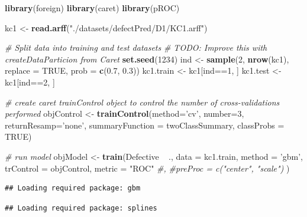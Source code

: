 \documentclass[]{book}
\newenvironment{Shaded}{\begin{snugshade}}{\end{snugshade}}
\newcommand{\KeywordTok}[1]{\textcolor[rgb]{0.13,0.29,0.53}{\textbf{{#1}}}}
\newcommand{\DataTypeTok}[1]{\textcolor[rgb]{0.13,0.29,0.53}{{#1}}}
\newcommand{\DecValTok}[1]{\textcolor[rgb]{0.00,0.00,0.81}{{#1}}}
\newcommand{\FloatTok}[1]{\textcolor[rgb]{0.00,0.00,0.81}{{#1}}}
\newcommand{\StringTok}[1]{\textcolor[rgb]{0.31,0.60,0.02}{{#1}}}
\newcommand{\CommentTok}[1]{\textcolor[rgb]{0.56,0.35,0.01}{\textit{{#1}}}}
\newcommand{\OtherTok}[1]{\textcolor[rgb]{0.56,0.35,0.01}{{#1}}}
\newcommand{\NormalTok}[1]{{#1}}
\begin{document}
\begin{Shaded}
\begin{Highlighting}[]
\KeywordTok{library}\NormalTok{(foreign)}
\KeywordTok{library}\NormalTok{(caret)}
\KeywordTok{library}\NormalTok{(pROC)}

\NormalTok{kc1 <-}\StringTok{ }\KeywordTok{read.arff}\NormalTok{(}\StringTok{"./datasets/defectPred/D1/KC1.arff"}\NormalTok{)}

\CommentTok{# Split data into training and test datasets}
\CommentTok{# TODO: Improve this with createDataParticion from Caret}
\KeywordTok{set.seed}\NormalTok{(}\DecValTok{1234}\NormalTok{)}
\NormalTok{ind <-}\StringTok{ }\KeywordTok{sample}\NormalTok{(}\DecValTok{2}\NormalTok{, }\KeywordTok{nrow}\NormalTok{(kc1), }\DataTypeTok{replace =} \OtherTok{TRUE}\NormalTok{, }\DataTypeTok{prob =} \KeywordTok{c}\NormalTok{(}\FloatTok{0.7}\NormalTok{, }\FloatTok{0.3}\NormalTok{))}
\NormalTok{kc1.train <-}\StringTok{ }\NormalTok{kc1[ind==}\DecValTok{1}\NormalTok{, ]}
\NormalTok{kc1.test <-}\StringTok{ }\NormalTok{kc1[ind==}\DecValTok{2}\NormalTok{, ]}


\CommentTok{# create caret trainControl object to control the number of cross-validations performed}
\NormalTok{objControl <-}\StringTok{ }\KeywordTok{trainControl}\NormalTok{(}\DataTypeTok{method=}\StringTok{'cv'}\NormalTok{, }\DataTypeTok{number=}\DecValTok{3}\NormalTok{, }\DataTypeTok{returnResamp=}\StringTok{'none'}\NormalTok{, }\DataTypeTok{summaryFunction =} \NormalTok{twoClassSummary, }\DataTypeTok{classProbs =} \OtherTok{TRUE}\NormalTok{)}


\CommentTok{# run model}
\NormalTok{objModel <-}\StringTok{ }\KeywordTok{train}\NormalTok{(Defective ~}\StringTok{ }\NormalTok{.,}
                  \DataTypeTok{data =} \NormalTok{kc1.train,}
                  \DataTypeTok{method =} \StringTok{'gbm'}\NormalTok{, }
                  \DataTypeTok{trControl =} \NormalTok{objControl,  }
                  \DataTypeTok{metric =} \StringTok{"ROC"} \CommentTok{#,}
                  \CommentTok{#preProc = c("center", "scale")}
                  \NormalTok{)}
\end{Highlighting}
\end{Shaded}

\begin{verbatim}
## Loading required package: gbm
\end{verbatim}

\begin{verbatim}
## Loading required package: splines
\end{verbatim}
\end{document}
